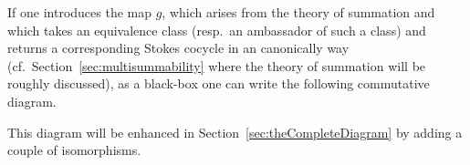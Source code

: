 If one introduces the map $g$, which arises from the theory of summation and
which takes an equivalence class (resp.\ an ambassador of such a class) and
returns a corresponding Stokes cocycle in an canonically way
(cf.\ Section~\ref{sec:multisummability} where the theory of summation  will be
roughly discussed), as a black-box one can write the following commutative
diagram.
\begin{center}
\end{center}\label{page:ofPreDiagram}
This diagram will be enhanced in Section~\ref{sec:theCompleteDiagram} by
adding a couple of isomorphisms.

